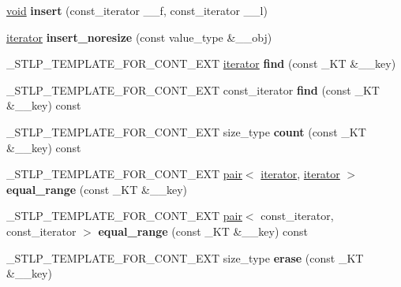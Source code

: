 \begin{DoxyCompactItemize}
\hyperlink{interfacevoid}{void} {\bfseries insert} (const\+\_\+iterator \+\_\+\+\_\+f, const\+\_\+iterator \+\_\+\+\_\+l)
\item 
\mbox{\label{classhash__multiset_ad3c657d752ff15458a613ec258a708e9}} 
\hyperlink{structiterator}{iterator} {\bfseries insert\+\_\+noresize} (const value\+\_\+type \&\+\_\+\+\_\+obj)
\item 
\mbox{\label{classhash__multiset_a67748e6e0d631950e480ab2a81bb2fdf}} 
\+\_\+\+S\+T\+L\+P\+\_\+\+T\+E\+M\+P\+L\+A\+T\+E\+\_\+\+F\+O\+R\+\_\+\+C\+O\+N\+T\+\_\+\+E\+XT \hyperlink{structiterator}{iterator} {\bfseries find} (const \+\_\+\+KT \&\+\_\+\+\_\+key)
\item 
\mbox{\label{classhash__multiset_a0bb133ac059dea039665c6f9b755f071}} 
\+\_\+\+S\+T\+L\+P\+\_\+\+T\+E\+M\+P\+L\+A\+T\+E\+\_\+\+F\+O\+R\+\_\+\+C\+O\+N\+T\+\_\+\+E\+XT const\+\_\+iterator {\bfseries find} (const \+\_\+\+KT \&\+\_\+\+\_\+key) const
\item 
\mbox{\label{classhash__multiset_a956b240d62edceb64b1fa0dfc1276337}} 
\+\_\+\+S\+T\+L\+P\+\_\+\+T\+E\+M\+P\+L\+A\+T\+E\+\_\+\+F\+O\+R\+\_\+\+C\+O\+N\+T\+\_\+\+E\+XT size\+\_\+type {\bfseries count} (const \+\_\+\+KT \&\+\_\+\+\_\+key) const
\item 
\mbox{\label{classhash__multiset_a0203ffde31edef1b6df3132654acbbde}} 
\+\_\+\+S\+T\+L\+P\+\_\+\+T\+E\+M\+P\+L\+A\+T\+E\+\_\+\+F\+O\+R\+\_\+\+C\+O\+N\+T\+\_\+\+E\+XT \hyperlink{structpair}{pair}$<$ \hyperlink{structiterator}{iterator}, \hyperlink{structiterator}{iterator} $>$ {\bfseries equal\+\_\+range} (const \+\_\+\+KT \&\+\_\+\+\_\+key)
\item 
\mbox{\label{classhash__multiset_af591a71b180ce76f0b8e241df3a67cf8}} 
\+\_\+\+S\+T\+L\+P\+\_\+\+T\+E\+M\+P\+L\+A\+T\+E\+\_\+\+F\+O\+R\+\_\+\+C\+O\+N\+T\+\_\+\+E\+XT \hyperlink{structpair}{pair}$<$ const\+\_\+iterator, const\+\_\+iterator $>$ {\bfseries equal\+\_\+range} (const \+\_\+\+KT \&\+\_\+\+\_\+key) const
\item 
\mbox{\label{classhash__multiset_a2d294274fe33f686865f8b4a47ccc518}} 
\+\_\+\+S\+T\+L\+P\+\_\+\+T\+E\+M\+P\+L\+A\+T\+E\+\_\+\+F\+O\+R\+\_\+\+C\+O\+N\+T\+\_\+\+E\+XT size\+\_\+type {\bfseries erase} (const \+\_\+\+KT \&\+\_\+\+\_\+key)

\end{DoxyCompactItemize}
